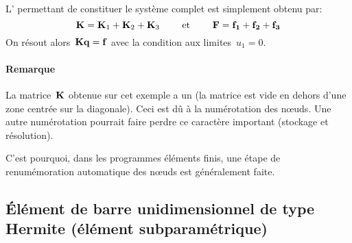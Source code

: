 \medskipvm
L' permettant de constituer le système complet est simplement obtenu par:
\begin{equation} \MM{K}=\MM{K}_1+\MM{K}_2+\MM{K}_3 \qquad \text{ et } \qquad \VV{F}=\VV{f_1}+\VV{f_2}+\VV{f_3} \end{equation}
\medskipvm
On résout alors~$\MM{K}\VV{q}=\VV{f}$ avec la condition aux limites~$u_1=0$.
\medskipvm
\paragraph{Remarque}
La matrice~$\MM{K}$ obtenue sur cet exemple a un  (la matrice est 
vide en dehors d'une zone centrée sur la diagonale). Ceci est dû à la numérotation des nœuds. 
Une autre numérotation pourrait faire perdre ce caractère important (stockage et résolution).

C'est pourquoi, dans les programmes éléments finis, une étape de renumémoration automatique des nœuds
est généralement faite.
\medskipvm
\subsection{Élément de barre unidimensionnel de type Hermite (élément subparamétrique)}

